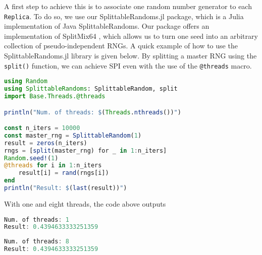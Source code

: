 \medskip 
A first step to achieve this is to associate one random number 
generator to each \texttt{Replica}. 
To do so, we use our SplittableRandoms.jl package, which is a Julia implementation 
of Java SplittableRandoms. Our package offers an implementation of  
SplitMix64 \cite{steele2014fast},
which allows us to turn one seed into an arbitrary collection of pseudo-independent 
RNGs. 
A quick example of how to use the SplittableRandoms.jl library is given below. 
By splitting a master RNG using the \texttt{split()} function, 
we can achieve SPI even with the use of the \texttt{@threads} macro. 

\begin{lstlisting}[language = Julia]
using Random
using SplittableRandoms: SplittableRandom, split
import Base.Threads.@threads

println("Num. of threads: $(Threads.nthreads())")

const n_iters = 10000
const master_rng = SplittableRandom(1)
result = zeros(n_iters)
rngs = [split(master_rng) for _ in 1:n_iters]
Random.seed!(1)
@threads for i in 1:n_iters
    result[i] = rand(rngs[i])
end
println("Result: $(last(result))")
\end{lstlisting}
With one and eight threads, the code above outputs
\begin{lstlisting}[language = Julia]
Num. of threads: 1
Result: 0.4394633333251359
\end{lstlisting}
\begin{lstlisting}[language = Julia]
Num. of threads: 8
Result: 0.4394633333251359
\end{lstlisting}